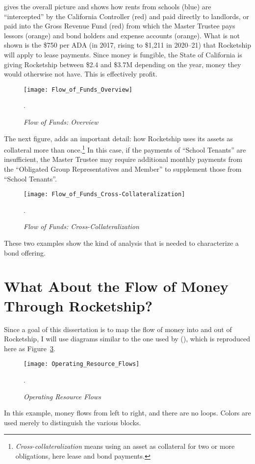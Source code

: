  gives the overall picture and shows how rents from schools (blue) are ``intercepted'' by the California Controller (red) and paid directly to landlords, or paid into the Gross Revenue Fund (red) from which the Master Trustee pays lessors (orange) and bond holders and expense accounts (orange). What is not shown is the \$750 per ADA (in 2017, rising to \$1,211 in 2020–21) that Rocketship will apply to lease payments. Since money is fungible, the State of California is giving Rocketship between \$2.4 and \$3.7M depending on the year, money they would otherwise not have. This is effectively profit.

\begin{figure}[hbt]
  \centering
  \caption[Flow of Funds: Overview]{\textit{Flow of Funds: Overview}}\label{fig:flow_of_funds_overview}
  \texttt{[image: Flow\_of\_Funds\_Overview]}\\
  \footnotesize\raggedright\textcite[53]{CSFA2017f}. 
\end{figure}

The next figure,  adds an important detail: how Rocketship uses its assets as collateral more than once.\footnote{\textit{Cross-collateralization} means using an asset as collateral for two or more obligations, here lease and bond payments.} In this case, if the payments of ``School Tenants'' are insufficient, the Master Trustee may require additional monthly payments from the ``Obligated Group Representatives and Member'' to supplement those from ``School Tenants''. 

\begin{figure}[hbt]
  \centering
  \caption[Flow of Funds: Cross-Collateralization]{\textit{Flow of Funds: Cross-Collateralization}}\label{fig:flow_of_funds_cross-collateralization}
  \texttt{[image: Flow\_of\_Funds\_Cross-Collateralization]}\\
  \footnotesize\raggedright\textcite[55]{CSFA2017f}.
\end{figure}

These two examples show the kind of analysis that is needed to characterize a bond offering.

\section{What About the Flow of Money Through Rocketship?}\label{sec:flows-of-money}\indent

Since a goal of this dissertation is to map the flow of money into and out of Rocketship, I will use diagrams similar to the one used by \citeauthor{Baker.Miron2015} (\citeyear{Baker.Miron2015}), which is reproduced here as Figure~\ref{fig:opresflows}.
\begin{figure}[ht]
  \centering
  \caption[Operating Resource Flows]{\textit{Operating Resource Flows}}\label{fig:opresflows}
  \texttt{[image: Operating\_Resource\_Flows]}\\
  \footnotesize\raggedright\textcite[16]{Baker.Miron2015}.
\end{figure}
In this example, money flows from left to right, and there are no loops. Colors are used merely to distinguish the various blocks.

